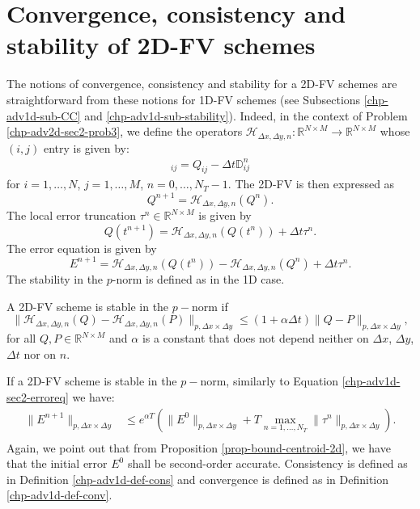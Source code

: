 \section{Convergence, consistency and stability of 2D-FV schemes}
\label{chp-adv2d-CCS}
The notions of convergence, consistency and stability for a 2D-FV schemes
are straightforward from these notions for 1D-FV schemes
(see Subsections \ref{chp-adv1d-sub-CC} and \ref{chp-adv1d-sub-stability}).
Indeed, in the context of Problem \ref{chp-adv2d-sec2-prob3}, we define the operators
$\mathcal{H}_{\Delta x ,\Delta y,n}: \mathbb{R}^{N \times M} \to \mathbb{R}^{N \times M}$ whose $(i,j)$ entry is given by:
\begin{align*}
	[\mathcal{H}_{\Delta x ,\Delta y,n}(Q)]_{ij} = Q_{ij} - \Delta t\mathbb{D}_{ij}^n
\end{align*}
for $i=1, \ldots, N$, $j=1, \ldots, M$, $n=0, \ldots, N_T-1$. The 2D-FV is then expressed as
\begin{equation*}
	Q^{n+1} = \mathcal{H}_{\Delta x ,\Delta y,n}(Q^n).
\end{equation*}
The local error truncation $\tau^n \in \mathbb{R}^{N \times M}$ is given by
\begin{equation*}
	Q(t^{n+1}) = \mathcal{H}_{\Delta x ,\Delta y,n}(Q(t^n)) + \Delta t \tau^n.
\end{equation*}
The error equation is given by
\begin{equation}
	E^{n+1} = \mathcal{H}_{\Delta x ,\Delta y,n}(Q(t^n)) - \mathcal{H}_{\Delta x ,\Delta y,n}(Q^n) +  \Delta t \tau^n.
\end{equation}
The stability in the $p$-norm is defined as in the 1D case.
\begin{definition}
	A 2D-FV scheme is stable in the $p-$norm if 
	\begin{equation}
		\|\mathcal{H}_{\Delta x ,\Delta y,n}(Q) - \mathcal{H}_{\Delta x ,\Delta y,n}(P)\|_{p,\Delta x \times \Delta y} \leq (1+\alpha \Delta t)  \|Q-P\|_{p,\Delta x \times \Delta y},
	\end{equation}
	for all $Q, P \in \mathbb{R}^{N\times M}$ and $\alpha$ is a constant
	that does not depend neither on $\Delta x$, $\Delta y$, $\Delta t$ nor on $n$.
\end{definition}
If a 2D-FV scheme is stable in the $p-$norm, similarly to Equation \eqref{chp-adv1d-sec2-erroreq} we have:
\begin{align*}
		\|E^{n+1}\|_{p,\Delta x \times \Delta y} &\leq e^{\alpha T}(\|E^0\|_{p,\Delta x \times \Delta y} + T\max_{n=1, \ldots, N_T}\|\tau^n\|_{p,\Delta x \times \Delta y}).\\
\end{align*}
Again, we point out that from Proposition \ref{prop-bound-centroid-2d}, we have that the initial error $E^0$ shall be second-order accurate.
Consistency is defined as in Definition \ref{chp-adv1d-def-cons} and convergence is defined as in Definition \ref{chp-adv1d-def-conv}.

